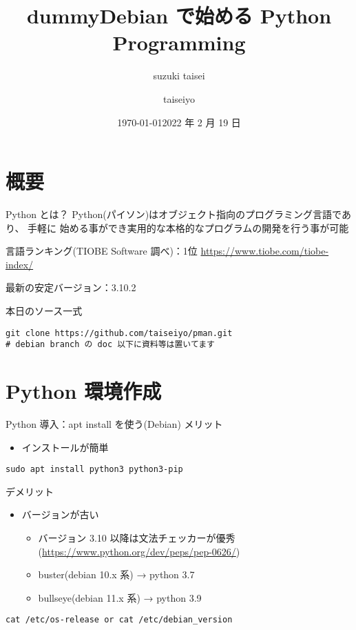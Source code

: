 \documentclass[compress,dvipdfmx,11pt]{beamer}
\author{suzuki taisei}
\date{\today}
\title{dummy}
\title[2022 年度 2 月 Debian 勉強会]{\bf Debian で始める Python Programming}
\author[]{taiseiyo}
\date{2022 年 2 月 19 日}
\begin{document}
\maketitle
\newcommand{\pivec}{\mathbf \pi}
\newcommand{\xvec}{\mathbf x}
\newcommand{\yvec}{\mathbf y}
\newcommand{\zvec}{\mathbf z}
\newcommand{\Emat}{\mathbf E}
\newcommand{\Imat}{\mathbf I}

\section{概要}
\label{sec:org37babc2}
\begin{frame}[label={sec:org5c10f1e},fragile]{Python とは？}
 Python(パイソン)はオブジェクト指向のプログラミング言語であり、 \alert{手軽に
始める事ができ実用的な本格的なプログラムの開発を行う事が可能}


言語ランキング(TIOBE Software 調べ)：1位
\url{https://www.tiobe.com/tiobe-index/}


最新の安定バージョン：3.10.2



本日のソース一式
\begin{verbatim}
git clone https://github.com/taiseiyo/pman.git
# debian branch の doc 以下に資料等は置いてます
\end{verbatim}
\end{frame}

\section{Python 環境作成}
\label{sec:orgc3d6628}
\begin{frame}[label={sec:org52d2fcd},fragile]{Python 導入：apt install を使う(Debian)}
 メリット
\begin{itemize}
\item インストールが簡単
\end{itemize}
\begin{verbatim}
sudo apt install python3 python3-pip
\end{verbatim}

デメリット
\begin{itemize}
\item バージョンが古い
\begin{itemize}
\item バージョン 3.10 以降は文法チェッカーが優秀(\url{https://www.python.org/dev/peps/pep-0626/})
\item buster(debian 10.x 系) → python 3.7
\item bullseye(debian 11.x 系) → python 3.9
\end{itemize}
\end{itemize}


\vspace{-2truemm}      
\begin{verbatim}
cat /etc/os-release or cat /etc/debian_version
\end{verbatim}
\end{frame}
\end{document}
